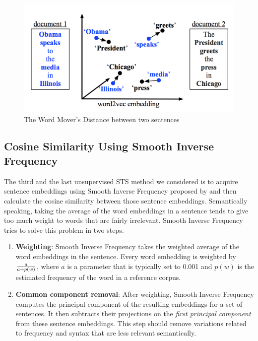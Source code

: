 \begin{figure}[ht]
	\centering
	\includegraphics[scale=0.4]{figures/semantic_textual_similarity/state_of_the_art/word_movers_distance.png}
	\caption[The Word Mover's Distance between two sentences]{The Word Mover's Distance between two sentences \autocite{10.5555/3045118.3045221}}
	\label{fig:WMD}
\end{figure}

\subsection{Cosine Similarity Using Smooth Inverse Frequency}
The third and the last unsupervised STS method we considered is to acquire sentence embeddings using Smooth Inverse Frequency proposed by \cite{DBLP:conf/iclr/AroraLM17} and then calculate the cosine similarity between those sentence embeddings. Semantically speaking, taking the average of the word embeddings in a sentence tends to give too much weight to words that are fairly irrelevant. Smooth Inverse Frequency tries to solve this problem in two steps. 

\begin{enumerate}
	\item \textbf{Weighting}: Smooth Inverse Frequency takes the weighted average of the word embeddings in the sentence. Every word embedding is weighted by $a\over{a + p(w)}$, where $a$ is a parameter that is typically set to 0.001 and $p(w)$ is the estimated frequency of the word in a reference corpus. 
	\item \textbf{Common component removal}: After weighting, Smooth Inverse Frequency computes the principal component of the resulting embeddings for a set of sentences. It then subtracts their projections on the \textit{first principal component} from these sentence embeddings. This step should remove variations related to frequency and syntax that are less relevant semantically.
\end{enumerate}

